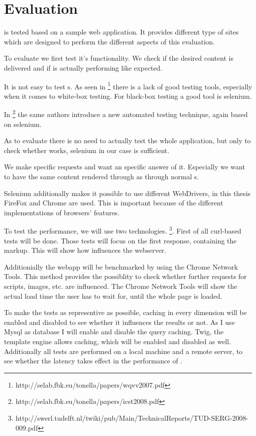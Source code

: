 \section{Evaluation}
\lare{} is tested based on a sample web application.
It provides different type of sites which are designed to perform the different aspects of this evaluation.

To evaluate \lare{} we first test it's functionality.
We check if the desired content is delivered and if \lare{} is actually performing like expected.

It is not easy to test \ajax{} \webApplication{}s.
As seen in \footnote{http://selab.fbk.eu/tonella/papers/wqvv2007.pdf} there is a lack of good testing tools, especially when it comes to white-box testing.
For black-box testing a good tool is selenium.

In \footnote{http://selab.fbk.eu/tonella/papers/icst2008.pdf} the same authors introduce a new automated testing technique, again based on selenium.

As to evaluate \lare{} there is no need to actually test the whole application, but only to check whether \lare{} works, selenium in our case is sufficient.

We make specific requests and want an specific answer of it.
Especially we want to have the same content rendered through \lare{} as through normal \httpRequest{}s.

Selenium additionally makes it possible to use different WebDrivers, in this thesis FireFox and Chrome are used.
This is important because of the different implementations of browsers' features.

To test the performance, we will use two technologies.
\footnote{http://swerl.tudelft.nl/twiki/pub/Main/TechnicalReports/TUD-SERG-2008-009.pdf}.
First of all curl-based tests will be done.
Those tests will focus on the first response, containing the markup.
This will show how \lare{} influences the webserver.

Additionially the webapp will be benchmarked by using the Chrome Network Tools.
This method provides the possiblity to check whether further requests for scripts, images, etc. are influenced.
The Chrome Network Tools will show the actual load time the user has to wait for, until the whole page is loaded.

To make the tests as representive as possible, caching in every dimension will be enabled and disabled to see whether it influences the results or not.
As I use Mysql as database I will enable and disable the query caching.
Twig, the template engine allows caching, which will be enabled and disabled as well.
Additionally all tests are performed on a local machine and a remote server, to see whether the latency takes effect in the performance of \lare{}.

